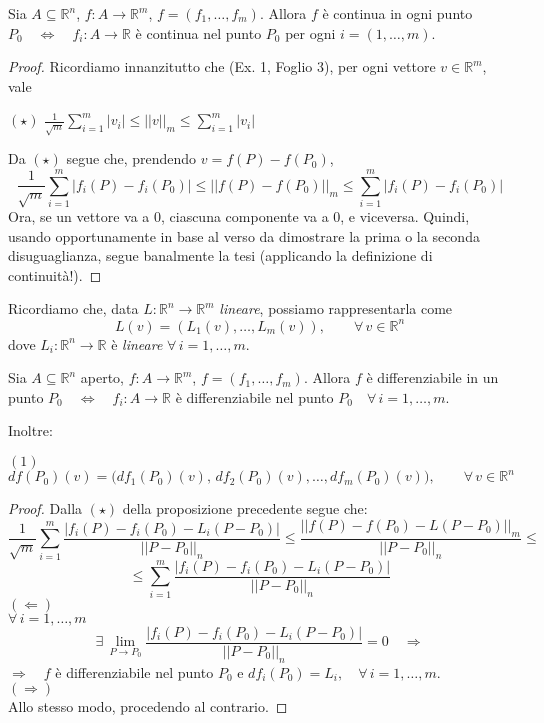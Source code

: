 \begin{proposition}
Sia $A \subseteq \mathbb{R}^n$, $f: A \longrightarrow \mathbb{R}^m$, $f=(f_1,\ldots,f_m)$. Allora $f$ è continua in ogni punto $P_0 \quad \Longleftrightarrow \quad f_i : A \longrightarrow \mathbb{R}$ è continua nel punto $P_0$ per ogni $i=(1,\ldots,m)$.
\end{proposition}
\begin{proof}
Ricordiamo innanzitutto che (Ex. 1, Foglio 3), per ogni vettore $v \in \mathbb{R}^m$, vale
\begin{center}
$\mathrm{(\star)}$
\hfill
$\displaystyle \frac{1}{\sqrt{m}} \sum_{i=1}^m|v_i| \leq ||v||_m \leq \sum_{i=1}^m|v_i|$
\hfill \null \\
\end{center}
Da $(\star)$ segue che, prendendo $v=f(P)-f(P_0)$,
$$
\frac{1}{\sqrt{m}} \sum_{i=1}^m|f_i(P)-f_i(P_0)| \leq ||f(P)-f(P_0)||_m \leq \sum_{i=1}^m|f_i(P)-f_i(P_0)|
$$
Ora, se un vettore va a $0$, ciascuna componente va a $0$, e viceversa. Quindi, usando opportunamente in base al verso da dimostrare la prima o la seconda disuguaglianza, segue banalmente la tesi (applicando la definizione di continuità!).
\end{proof}

Ricordiamo che, data $L: \mathbb{R}^n \longrightarrow \mathbb{R}^m$ \emph{lineare}, possiamo rappresentarla come
$$
L(v) = (L_1(v),\ldots,L_m(v)), \qquad \forall \, v \in \mathbb{R}^n
$$
dove $L_i: \mathbb{R}^n \longrightarrow \mathbb{R}$ è \emph{lineare} $\forall \, i=1,\ldots,m$.

\begin{proposition}
Sia $A \subseteq \mathbb{R}^n$ aperto, $f: A \longrightarrow \mathbb{R}^m$, $f=(f_1,\ldots,f_m)$. Allora $f$ è differenziabile in un punto $P_0 \quad \Longleftrightarrow \quad f_i : A \longrightarrow \mathbb{R}$ è differenziabile nel punto $P_0 \quad \forall \, i=1,\ldots,m$.

Inoltre:
\begin{center}
$\mathrm{(1)}$
\hfill
$\displaystyle df(P_0)(v) = \Big( df_1(P_0)(v),\,df_2(P_0)(v),\ldots,df_m(P_0)(v) \Big), \qquad \forall \, v \in \mathbb{R}^n$
\hfill \null \\
\end{center}
\end{proposition}
\begin{proof}
Dalla $(\star)$ della proposizione precedente segue che:
$$
\frac{1}{\sqrt{m}} \sum_{i=1}^m \frac{|f_i(P)-f_i(P_0)-L_i(P-P_0)|}{||P-P_0||_n} \leq \frac{||f(P)-f(P_0)-L(P-P_0)||_m}{||P-P_0||_n} \leq
$$
$$
\leq \sum_{i=1}^m \frac{|f_i(P)-f_i(P_0)-L_i(P-P_0)|}{||P-P_0||_n}
$$
$(\Leftarrow)$\\
$\forall\, i=1,\ldots,m$
$$
\exists \, \lim_{P \rightarrow P_0} \frac{|f_i(P)-f_i(P_0)-L_i(P-P_0)|}{||P-P_0||_n} = 0 \quad \Longrightarrow 
$$
$\Longrightarrow \quad f$ è differenziabile nel punto $P_0$ e $df_i(P_0) = L_i, \quad \forall \, i=1,\ldots,m$.\\
$(\Rightarrow)$\\
Allo stesso modo, procedendo al contrario.
\end{proof}


